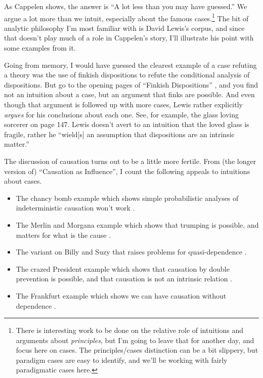 As Cappelen shows, the answer is ``A lot less than you may have guessed.'' We argue a lot more than we intuit, especially about the famous cases.\footnote{There is interesting work to be done on the relative role of intuitions and arguments about \textit{principles}, but I'm going to leave that for another day, and focus here on cases. The principles/cases distinction can be a bit slippery, but paradigm cases are easy to identify, and we'll be working with fairly paradigmatic cases here.} The bit of analytic philosophy I'm most familiar with is David Lewis's corpus, and since that doesn't play much of a role in Cappelen's story, I'll illustrate his point with some examples from it.

Going from memory, I would have guessed the clearest example of a case refuting a theory was the use of finkish dispositions to refute the conditional analysis of dispositions. But go to the opening pages of ``Finkish Dispositions'' \citep{Lewis1997b}, and you find not an intuition about a case, but an argument that finks are possible. And even though that argument is followed up with more cases, Lewis rather explicitly \textit{argues} for his conclusions about each one. See, for example, the glass loving sorcerer on page 147. Lewis doesn't avert to an intuition that the loved glass is fragile, rather he ``wield[s] an assumption that dispositions are an intrinsic matter.'' \citep[147]{Lewis1997b}

The discussion of causation turns out to be a little more fertile. From (the longer version of) ``Causation as Influence'', I count the following appeals to intuitions about cases. 

\begin{itemize}
\item The chancy bomb example which shows simple probabilistic analyses of indeterministic causation won't work \citep[79]{Lewis2004a}.
\item The Merlin and Morgana example which shows that trumping is possible, and matters for what is the cause \citep[81]{Lewis2004a}.
\item The variant on Billy and Suzy that raises problems for quasi-dependence \citep[83]{Lewis2004a}.
\item The crazed President example which shows that causation by double prevention is possible, and that causation is not an intrinsic relation \citep[84]{Lewis2004a}.
\item The Frankfurt example which shows we can have causation without dependence \citep[95]{Lewis2004a}.
\end{itemize}

